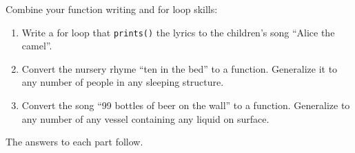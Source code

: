 \documentclass[]{book}
\theoremstyle{plain}
\theoremstyle{remark}
\begin{document}
Combine your function writing and for loop skills:

\begin{enumerate}
\def\labelenumi{\arabic{enumi}.}
\item
  Write a for loop that \texttt{prints()} the lyrics to the children's
  song ``Alice the camel''.
\item
  Convert the nursery rhyme ``ten in the bed'' to a function. Generalize
  it to any number of people in any sleeping structure.
\item
  Convert the song ``99 bottles of beer on the wall'' to a function.
  Generalize to any number of any vessel containing any liquid on
  surface.
\end{enumerate}

The answers to each part follow.
\end{document}
